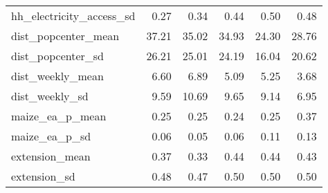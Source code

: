 \begin{table}[ht]
\begin{tabular}{lrrrrr}
  hh_electricity_access_sd & 0.27 & 0.34 & 0.44 & 0.50 & 0.48 \\ 
  dist_popcenter_mean & 37.21 & 35.02 & 34.93 & 24.30 & 28.76 \\ 
  dist_popcenter_sd & 26.21 & 25.01 & 24.19 & 16.04 & 20.62 \\ 
  dist_weekly_mean & 6.60 & 6.89 & 5.09 & 5.25 & 3.68 \\ 
  dist_weekly_sd & 9.59 & 10.69 & 9.65 & 9.14 & 6.95 \\ 
  maize_ea_p_mean & 0.25 & 0.25 & 0.24 & 0.25 & 0.37 \\ 
  maize_ea_p_sd & 0.06 & 0.05 & 0.06 & 0.11 & 0.13 \\ 
  extension_mean & 0.37 & 0.33 & 0.44 & 0.44 & 0.43 \\ 
  extension_sd & 0.48 & 0.47 & 0.50 & 0.50 & 0.50 \\ 
   \hline
\end{tabular}
\end{table}
